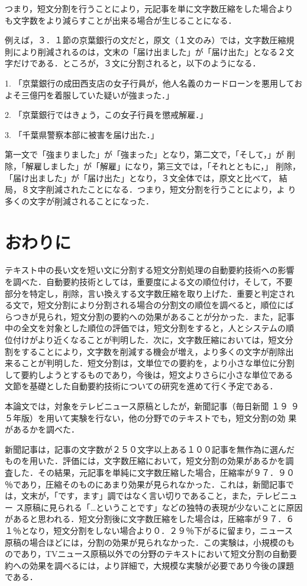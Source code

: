 つまり，短文分割を行うことにより，元記事を単に文字数圧縮をした場合より
も文字数をより減らすことが出来る場合が生じることになる．

例えば，３．１節の京葉銀行の文だと，原文（１文のみ）では，文字数圧縮規
則により削減されるのは，文末の「届け出ました」が「届け出た」となる２文
字だけである．ところが，３文に分割されると，以下のようになる．

\begin{list}{}{}
\item[1.] 「京葉銀行の成田西支店の女子行員が，他人名義のカードローンを悪用しておよそ三億円を着服していた疑いが強まった．」
\item[2.] 「京葉銀行ではきょう，この女子行員を懲戒解雇．」
\item[3.] 「千葉県警察本部に被害を届け出た．」
\end{list}

第一文で「強まりました」が「強まった」となり，第二文で，「そして，」が
削除，「解雇しました」が「解雇」になり，第三文では，「それとともに，」
削除，「届け出ました」が「届け出た」となり，３文全体では，原文と比べて，
結局，８文字削減されたことになる．つまり，短文分割を行うことにより，よ
り多くの文字が削減されることになった．

\section{おわりに}\label{sec:owarini}
テキスト中の長い文を短い文に分割する短文分割処理の自動要約技術への影響
を調べた．自動要約技術としては，重要度による文の順位付け，そして，不要
部分を特定し，削除，言い換えする文字数圧縮を取り上げた．重要と判定され
る文で，短文分割により分割される場合の分割文の順位を調べると，順位にば
らつきが見られ，短文分割の要約への効果があることが分かった．また，記事
中の全文を対象とした順位の評価では，短文分割をすると，人とシステムの順
位付けがより近くなることが判明した．次に，文字数圧縮においては，短文分
割をすることにより，文字数を削減する機会が増え，より多くの文字が削除出
来ることが判明した．短文分割は，文単位での要約を，より小さな単位に分割
して要約しようとするものであり，今後は，短文よりさらに小さな単位である
文節を基礎とした自動要約技術についての研究を進めて行く予定である．

本論文では，対象をテレビニュース原稿としたが，新聞記事（毎日新聞 １９
９５年版）を用いて実験を行ない，他の分野でのテキストでも，短文分割の効
果があるかを調べた．

新聞記事は，記事の文字数が２５０文字以上ある１００記事を無作為に選んだ
ものを用いた．評価には，文字数圧縮において，短文分割の効果があるかを調
査した．その結果，元記事を単純に文字数圧縮した場合，圧縮率が９７．９０
％であり，圧縮そのものにあまり効果が見られなかった．これは，新聞記事で
は，文末が，「です，ます」調ではなく言い切りであること，また，テレビニュー
ス原稿に見られる「…ということです」などの独特の表現が少ないことに原因
があると思われる．短文分割後に文字数圧縮をした場合は，圧縮率が９７．６
１％となり，短文分割をしない場合より０．２９％下がるに留まり，ニュース
原稿の場合ほどには，分割の効果が見られなかった．この実験は，小規模のも
のであり，TVニュース原稿以外での分野のテキストにおいて短文分割の自動要
約への効果を調べるには，より詳細で，大規模な実験が必要であり今後の課題
である．

